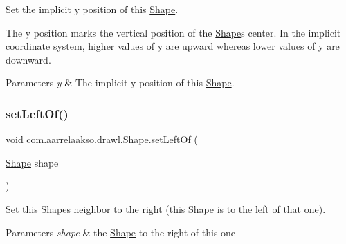Set the implicit y position of this \hyperlink{classcom_1_1aarrelaakso_1_1drawl_1_1_shape}{Shape}. 

The y position marks the vertical position of the \hyperlink{classcom_1_1aarrelaakso_1_1drawl_1_1_shape}{Shape}\textquotesingle{}s center. In the implicit coordinate system, higher values of y are upward whereas lower values of y are downward.


\begin{DoxyParams}{Parameters}
{\em y} & The implicit y position of this \hyperlink{classcom_1_1aarrelaakso_1_1drawl_1_1_shape}{Shape}. \\
\hline
\end{DoxyParams}
\mbox{\label{classcom_1_1aarrelaakso_1_1drawl_1_1_shape_aad14fa860ab74cfa90815f56cf4c3ecf}} 
\subsubsection{\texorpdfstring{set\+Left\+Of()}{setLeftOf()}}
{\footnotesize\ttfamily void com.\+aarrelaakso.\+drawl.\+Shape.\+set\+Left\+Of (\begin{DoxyParamCaption}\item[{\hyperlink{classcom_1_1aarrelaakso_1_1drawl_1_1_shape}{Shape}}]{shape }\end{DoxyParamCaption})\hspace{0.3cm}{\ttfamily [inherited]}}

Set this \hyperlink{classcom_1_1aarrelaakso_1_1drawl_1_1_shape}{Shape}\textquotesingle{}s neighbor to the right (this \hyperlink{classcom_1_1aarrelaakso_1_1drawl_1_1_shape}{Shape} is to the left of that one).


\begin{DoxyParams}{Parameters}
{\em shape} & the \hyperlink{classcom_1_1aarrelaakso_1_1drawl_1_1_shape}{Shape} to the right of this one \\
\hline
\end{DoxyParams}
\mbox{\label{classcom_1_1aarrelaakso_1_1drawl_1_1_shape_a09e1586ce85c1d964cc3b7ce94bc5d4c}} 
